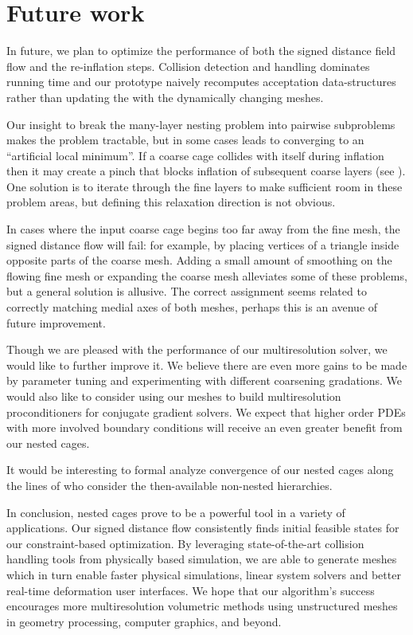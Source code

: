 \section{Future work}
\label{sec:conclusion}
%
In future, we plan to optimize the performance of both the signed distance
field flow and the re-inflation steps.
%
Collision detection and handling dominates running time and our prototype
naively recomputes acceptation data-structures rather than updating the with
the dynamically changing meshes.

Our insight to break the many-layer nesting problem into pairwise subproblems
makes the problem tractable, but in some cases leads to converging to an
``artificial local minimum''. If a coarse cage collides with itself during
inflation then it may create a pinch that blocks inflation of subsequent coarse
layers (see ).
%
One solution is to iterate through the fine layers to make sufficient room in
these problem areas, but defining this relaxation direction is not obvious.

In cases where the input coarse cage begins too far away from the fine mesh,
the signed distance flow will fail: for example, by placing vertices of a
triangle inside opposite parts of the coarse mesh. 
%
Adding a small amount of smoothing on the flowing fine mesh or expanding the
coarse mesh alleviates some of these problems, but a general solution is
allusive.
%
The correct assignment seems related to correctly matching medial axes of both
meshes, perhaps this is an avenue of future improvement.

Though we are pleased with the performance of our multiresolution solver, 
we would like to further improve it. We believe there are even more gains to be
made by parameter tuning and experimenting with different coarsening
gradations. We would also like to consider using our meshes to build
multiresolution proconditioners for conjugate gradient solvers.
%
We expect that higher order PDEs with more involved boundary conditions will
receive an even greater benefit from our nested cages.

It would be interesting to formal analyze convergence of our nested cages along
the lines of \cite{chan1996convergence} who consider the then-available
non-nested hierarchies.


In conclusion, nested cages prove to be a powerful tool in a variety of
applications. 
%
Our signed distance flow consistently finds initial feasible states for our
constraint-based optimization.
%
By leveraging state-of-the-art collision handling tools from physically based
simulation, we are able to generate meshes which in turn enable faster physical
simulations, linear system solvers and better real-time deformation user
interfaces.
%
We hope that our algorithm's success encourages more multiresolution volumetric
methods using unstructured meshes in geometry processing, computer graphics,
and beyond.

